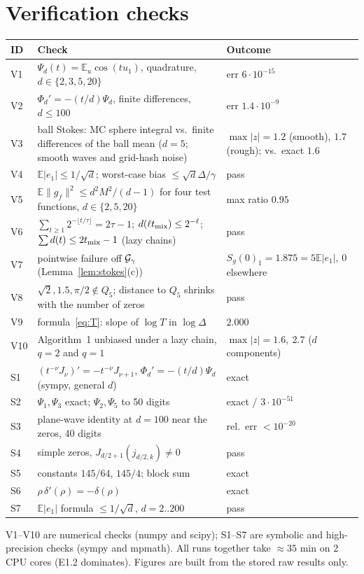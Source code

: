 \documentclass[11pt,a4paper]{article}
\numberwithin{equation}{section}
\theoremstyle{definition}
\theoremstyle{remark}
\newcommand{\E}{\mathbb E}\newcommand{\R}{\mathbb R}\newcommand{\N}{\mathbb N}\newcommand{\Prob}{\mathbb P}
\newcommand{\norm}[1]{\lVert #1\rVert}\newcommand{\abs}[1]{\lvert #1\rvert}\newcommand{\ip}[2]{\langle #1,#2\rangle}
\begin{document}
\appendix
\section{Verification checks}\label{app:checks}
\begin{center}\small
\begin{tabularx}{\textwidth}{@{}lXl@{}}
\toprule
\textbf{ID} & \textbf{Check} & \textbf{Outcome}\\\midrule
V1 & $\Psi_d(t)=\E_u\cos(tu_1)$, quadrature, $d\in\{2,3,5,20\}$ & err $6\cdot10^{-15}$ \\
V2 & $\Phi_d'=-(t/d)\Psi_d$, finite differences, $d\le100$ & err $1.4\cdot10^{-9}$ \\
V3 & ball Stokes: MC sphere integral vs.\ finite differences of the ball mean ($d=5$; smooth waves and grid-hash noise) & $\max|z|=1.2$ (smooth), $1.7$ (rough); vs.\ exact $1.6$ \\
V4 & $\E|e_1|\le1/\sqrt d$; worst-case bias $\le\sqrt d\Delta/\gamma$ & pass \\
V5 & $\E\norm{g_f}^2\le d^2M^2/(d-1)$ for four test functions, $d\in\{2,5,20\}$ & max ratio $0.95$ \\
V6 & $\sum_{t\ge1}2^{-\lfloor t/\tau\rfloor}=2\tau-1$; $d(\ell t_{\rm mix})\le2^{-\ell}$; $\sum d(t)\le2t_{\rm mix}-1$ (lazy chains) & pass \\
V7 & pointwise failure off $\mathcal G_\gamma$ (Lemma~\ref{lem:stokes}(c)) & $S_g(0)_1=1.875=5\E|e_1|$, $0$ elsewhere \\
V8 & $\sqrt2,1.5,\pi/2\notin Q_5$; distance to $Q_5$ shrinks with the number of zeros & pass \\
V9 & formula~\eqref{eq:T}: slope of $\log T$ in $\log\Delta$ & $2.000$ \\
V10 & Algorithm~1 unbiased under a lazy chain, $q=2$ and $q=1$ & $\max|z|=1.6,\ 2.7$ ($d$ components) \\
S1 & $(t^{-\nu}J_\nu)'=-t^{-\nu}J_{\nu+1}$, $\Phi_d'=-(t/d)\Psi_d$ (sympy, general $d$) & exact \\
S2 & $\Psi_1,\Psi_3$ exact; $\Psi_2,\Psi_5$ to 50 digits & exact / $3\cdot10^{-51}$ \\
S3 & plane-wave identity at $d=100$ near the zeros, 40 digits & rel.\ err $<10^{-20}$ \\
S4 & simple zeros, $J_{d/2+1}(j_{d/2,k})\neq0$ & pass \\
S5 & constants $145/64$, $145/4$; block sum & exact \\
S6 & $\rho\,\delta'(\rho)=-\delta(\rho)$ & exact \\
S7 & $\E|e_1|$ formula $\le1/\sqrt d$, $d=2..200$ & pass \\
\bottomrule
\end{tabularx}
\end{center}
V1--V10 are numerical checks (numpy and scipy); S1--S7 are symbolic and high-precision checks (sympy and mpmath). All runs together take $\approx35$ min on 2 CPU cores (E1.2 dominates). Figures are built from the stored raw results only.
\end{document}
